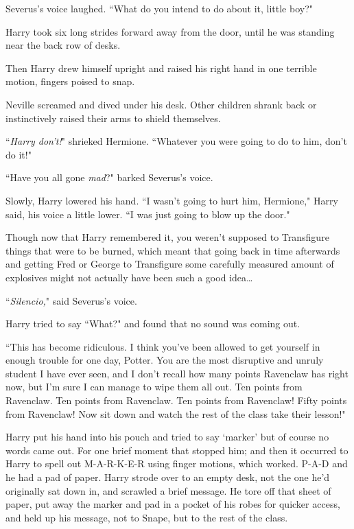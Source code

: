 Severus's voice laughed. ``What do you intend to do about it, little boy?"

Harry took six long strides forward away from the door, until he was standing near the back row of desks.

Then Harry drew himself upright and raised his right hand in one terrible motion, fingers poised to snap.

Neville screamed and dived under his desk. Other children shrank back or instinctively raised their arms to shield themselves.

``\emph{Harry don't!}" shrieked Hermione. ``Whatever you were going to do to him, don't do it!"

``Have you all gone \emph{mad}?" barked Severus's voice.

Slowly, Harry lowered his hand. ``I wasn't going to hurt him, Hermione," Harry said, his voice a little lower. ``I was just going to blow up the door."

Though now that Harry remembered it, you weren't supposed to Transfigure things that were to be burned, which meant that going back in time afterwards and getting Fred or George to Transfigure some carefully measured amount of explosives might not actually have been such a good idea…

``\emph{Silencio,}" said Severus's voice.

Harry tried to say ``What?" and found that no sound was coming out.

``This has become ridiculous. I think you've been allowed to get yourself in enough trouble for one day, Potter. You are the most disruptive and unruly student I have ever seen, and I don't recall how many points Ravenclaw has right now, but I'm sure I can manage to wipe them all out. Ten points from Ravenclaw. Ten points from Ravenclaw. Ten points from Ravenclaw! Fifty points from Ravenclaw! Now sit down and watch the rest of the class take their lesson!"

Harry put his hand into his pouch and tried to say `marker' but of course no words came out. For one brief moment that stopped him; and then it occurred to Harry to spell out M-A-R-K-E-R using finger motions, which worked. P-A-D and he had a pad of paper. Harry strode over to an empty desk, not the one he'd originally sat down in, and scrawled a brief message. He tore off that sheet of paper, put away the marker and pad in a pocket of his robes for quicker access, and held up his message, not to Snape, but to the rest of the class.

